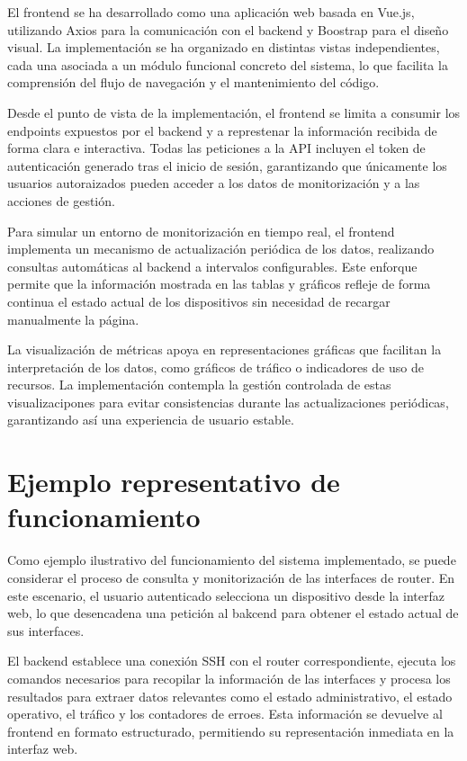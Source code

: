 El frontend se ha desarrollado como una aplicación web basada en Vue.js, utilizando Axios para la comunicación con el backend y Boostrap para el diseño visual. La implementación se ha organizado en distintas vistas independientes, cada una asociada a un módulo funcional concreto del sistema, lo que facilita la comprensión del flujo de navegación y el mantenimiento del código.

Desde el punto de vista de la implementación, el frontend se limita a consumir los endpoints expuestos por el backend y a represtenar la información recibida de forma clara e interactiva. Todas las peticiones a la API incluyen el token de autenticación generado tras el inicio de sesión, garantizando que únicamente los usuarios autoraizados pueden acceder a los datos de monitorización y a las acciones de gestión.

Para simular un entorno de monitorización en tiempo real, el frontend implementa un mecanismo de actualización periódica de los datos, realizando consultas automáticas al backend a intervalos configurables. Este enforque permite que la información mostrada en las tablas y gráficos refleje de forma continua el estado actual de los dispositivos sin necesidad de recargar manualmente la página.

La visualización de métricas apoya en representaciones gráficas que facilitan la interpretación de los datos, como gráficos de tráfico o indicadores de uso de recursos. La implementación contempla la gestión controlada de estas visualizacipones para evitar consistencias durante las actualizaciones periódicas, garantizando así una experiencia de usuario estable.

\section{Ejemplo representativo de funcionamiento}

Como ejemplo ilustrativo del funcionamiento del sistema implementado, se puede considerar el proceso de consulta y monitorización de las interfaces de router. En este escenario, el usuario autenticado selecciona un dispositivo desde la interfaz web, lo que desencadena una petición al bakcend para obtener el estado actual de sus interfaces.

El backend establece una conexión SSH con el router correspondiente, ejecuta los comandos necesarios para recopilar la información de las interfaces y procesa los resultados para extraer datos relevantes como el estado administrativo, el estado operativo, el tráfico y los contadores de erroes. Esta información se devuelve al frontend en formato estructurado, permitiendo su representación inmediata en la interfaz web.

